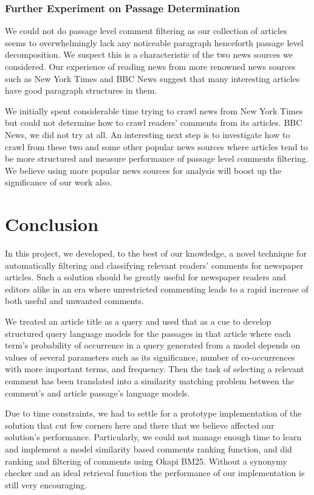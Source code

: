 \documentclass[article]{IEEEtran}
\begin{document}
\subsubsection{Further Experiment on Passage Determination} We could not do passage level comment filtering as our collection of articles seems to overwhelmingly lack any noticeable paragraph henceforth passage level decomposition. We suspect this is a characteristic of the two news sources we considered. Our experience of reading news from more renowned news sources such as New York Times and BBC News suggest that many interesting articles have good paragraph structures in them. 

We initially spent considerable time trying to crawl news from New York Times but could not determine how to crawl readers' comments from its articles. BBC News, we did not try at all. An interesting next step is to investigate how to crawl from these two and some other popular news sources where articles tend to be more structured and measure performance of passage level comments filtering. We believe using more popular news sources for analysis will boost up the significance of our work also.     
 
\section{Conclusion}
\label{con}
In this project, we developed, to the best of our knowledge, a novel technique for automatically filtering and classifying relevant readers' comments for newspaper articles. Such a solution should be greatly useful for newspaper readers and editors alike in an era where unrestricted commenting leads to a rapid increase of both useful and unwanted comments.

We treated an article title as a query and used that as a cue to develop structured query language models for the passages in that article where each term's probability of occurrence in a query generated from a model depends on values of several parameters such as its significance, number of co-occurrences with more important terms, and frequency. Then the task of selecting a relevant comment has been translated into a similarity matching problem between the comment's and article passage's language models. 

Due to time constraints, we had to settle for a prototype implementation of the solution that cut few corners here and there that we believe affected our solution's performance. Particularly, we could not manage enough time to learn and implement a model similarity based comments ranking function, and did ranking and filtering of comments using Okapi BM25. Without a synonymy checker and an ideal retrieval function the performance of our implementation is still very encouraging.
\end{document}
